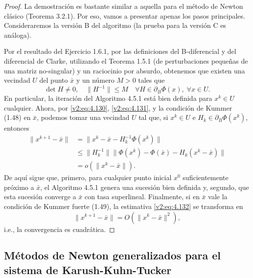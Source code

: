 \begin{proof}
    La demostración es bastante similar a aquella para el método de Newton clásico (Teorema 3.2.1). Por eso, vamos a presentar apenas los pasos principales. Consideraremos la versión B del algoritmo (la prueba para la versión C es análoga).

    Por el resultado del Ejercicio 1.6.1, por las definiciones del B-diferencial y del diferencial de Clarke, utilizando el Teorema 1.5.1 (de perturbaciones pequeñas de una matriz no-singular) y un raciocinio por absurdo, obtenemos que existen una vecindad $U$ del punto $\bar{x}$ y un número $M > 0$ tales que
    \begin{equation}
        \det H \neq 0, \quad \|H^{-1}\| \le M \quad \forall H \in \partial_B \Phi(x), \; \forall x \in U.
        \label{v2:eq:4.131}
    \end{equation}
    En particular, la iteración del Algoritmo 4.5.1 está bien definida para $x^k \in U$ cualquier.
    Ahora, por \eqref{v2:eq:4.130}, \eqref{v2:eq:4.131}, y la condición de Kummer (1.48) en $\bar{x}$, podemos tomar una vecindad $U$ tal que, si $x^k \in U$ e $H_k \in \partial_B \Phi(x^k)$, entonces
    \begin{align}
        \|x^{k+1} - \bar{x}\| &= \|x^k - \bar{x} - H_k^{-1}\Phi(x^k)\| \nonumber \\
        &\le \|H_k^{-1}\| \|\Phi(x^k) - \Phi(\bar{x}) - H_k(x^k - \bar{x})\| \nonumber \\
        &= o(\|x^k - \bar{x}\|).
        \label{v2:eq:4.132}
    \end{align}
    De aquí sigue que, primero, para cualquier punto inicial $x^0$ suficientemente próximo a $\bar{x}$, el Algoritmo 4.5.1 genera una sucesión bien definida y, segundo, que esta sucesión converge a $\bar{x}$ con tasa superlineal.
    Finalmente, si en $\bar{x}$ vale la condición de Kummer fuerte (1.49), la estimativa \eqref{v2:eq:4.132} se transforma en
    \[
        \|x^{k+1} - \bar{x}\| = O(\|x^k - \bar{x}\|^2),
    \]
    i.e., la convergencia es cuadrática.
\end{proof}

\subsection{Métodos de Newton generalizados para el sistema de Karush-Kuhn-Tucker}\label{v2:sec:4.5.2}


